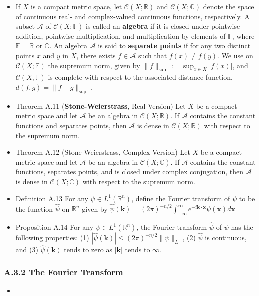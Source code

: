 \begin{itemize}
\item If $X$ is a compact metric space, let $\mathcal{C}(X ; \mathbb{R})$ and $\mathcal{C}(X ; \mathbb{C})$ denote the space of continuous real- and complex-valued continuous functions, respectively. A subset $\mathcal{A}$ of $\mathcal{C}(X ; \mathbb{F})$ is called an \textbf{algebra} if it is closed under pointwise addition, pointwise multiplication, and multiplication by elements of $\mathbb{F}$, where $\mathbb{F}=\mathbb{R}$ or $\mathbb{C}$. An algebra $\mathcal{A}$ is said to \textbf{separate points} if for any two distinct points $x$ and $y$ in $X$, there exists $f \in \mathcal{A}$ such that $f(x) \neq f(y)$. We use on $\mathcal{C}(X ; \mathbb{F})$ the supremum norm, given by $\|f\|_{\text {sup }}:=\sup _{x \in X}|f(x)|$, and $\mathcal{C}(X, \mathbb{F})$ is complete with respect to the associated distance function, $d(f, g)=\|f-g\|_{\text {sup }}$.

\item Theorem A.11 (\textbf{Stone-Weierstrass}, Real Version) Let $X$ be a compact metric space and let $\mathcal{A}$ be an algebra in $\mathcal{C}(X ; \mathbb{R})$. If $\mathcal{A}$ contains the constant functions and separates points, then $\mathcal{A}$ is dense in $\mathcal{C}(X ; \mathbb{R})$ with respect to the supremum norm.

\item Theorem A.12 (Stone-Weierstrass, Complex Version) Let $X$ be a compact metric space and let $\mathcal{A}$ be an algebra in $\mathcal{C}(X ; \mathbb{C})$. If $\mathcal{A}$ contains the constant functions, separates points, and is closed under complex conjugation, then $\mathcal{A}$ is dense in $\mathcal{C}(X ; \mathbb{C})$ with respect to the supremum norm.

\item Definition A.13 For any $\psi \in L^{1}\left(\mathbb{R}^{n}\right)$, define the Fourier transform of $\psi$ to be the function $\hat{\psi}$ on $\mathbb{R}^{n}$ given by $\hat{\psi}(\mathbf{k})=(2 \pi)^{-n / 2} \int_{-\infty}^{\infty} e^{-i \mathbf{k} \cdot \mathbf{x}} \psi(\mathbf{x}) d \mathbf{x}$

\item Proposition A.14 For any $\psi \in L^{1}\left(\mathbb{R}^{n}\right)$, the Fourier transform $\hat{\psi}$ of $\psi$ has the following properties: (1) $|\hat{\psi}(\mathbf{k})| \leq(2 \pi)^{-n / 2}\|\psi\|_{L^{1}}$, (2) $\hat{\psi}$ is continuous, and (3) $\hat{\psi}(\mathbf{k})$ tends to zero as $|\mathbf{k}|$ tends to $\infty$.
\end{itemize}

\subsubsection{A.3.2 The Fourier Transform}

\begin{itemize}
\item 
\end{itemize}

